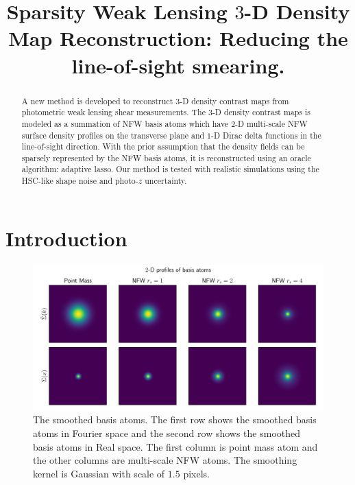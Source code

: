 \documentclass[twocolumn]{aastex62}
\newcommand \redColor{\color{red}}
\begin{document}
\title{Sparsity Weak Lensing $3$-D Density Map Reconstruction: 
Reducing the line-of-sight smearing.}

\begin{abstract}
A new method is developed to reconstruct $3$-D density contrast maps from photometric weak lensing shear measurements.
The $3$-D density contrast maps is modeled as a summation of NFW basis atoms which have $2$-D multi-scale NFW surface 
density profiles on the transverse plane and $1$-D Dirac delta functions in the line-of-sight direction. With the prior 
assumption that the density fields can be sparsely represented by the NFW basis atoms, it is reconstructed using an 
oracle algorithm: adaptive lasso. Our method is tested with realistic simulations using the HSC-like shape noise and 
photo-$z$ uncertainty.
{\redColor{Add descriptions on the outcomes of the test on the simulations.}}
\end{abstract}

\section{Introduction}

\begin{figure}[!t]
    \includegraphics[width=1.\textwidth]{nfwlet-atom-2D.pdf}
    \caption{The smoothed basis atoms. The first row shows the smoothed basis atoms in Fourier space 
            and the second row shows the smoothed basis atoms in Real space. 
            The first column is point mass atom and the other columns are multi-scale NFW atoms.
            The smoothing kernel is Gaussian with scale of $1.5$ pixels.} \label{fig-atoms2D}
\end{figure}
\end{document}
